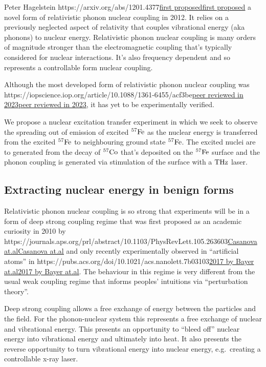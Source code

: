 \documentclass[
]{article}
\let\oldhref\href
\renewcommand{\href}[2]{\ifx#1\urlprefix\oldhref{#1}{#2}\else\uline{\oldhref{#1}{#2}}\fi}
\renewcommand{\[}{\begin{equation}}
\renewcommand{\]}{\end{equation}}
\begin{document}
Peter Hagelstein \href{https://arxiv.org/abs/1201.4377}{first proposed}
a novel form of relativistic phonon nuclear coupling in 2012. It relies
on a previously neglected aspect of relativity that couples vibrational
energy (aka phonons) to nuclear energy. Relativistic phonon nuclear
coupling is many orders of magnitude stronger than the electromagnetic
coupling that's typically considered for nuclear interactions. It's also
frequency dependent and so represents a controllable form nuclear
coupling.

Although the most developed form of relativistic phonon nuclear coupling
was
\href{https://iopscience.iop.org/article/10.1088/1361-6455/acf3be}{peer
reviewed in 2023}, it has yet to be experimentally verified.

We propose a nuclear excitation transfer experiment in which we seek to
observe the spreading out of emission of excited \(\rm ^{57}Fe\) as the
nuclear energy is transferred from the excited \(\rm ^{57}Fe\) to
neighbouring ground state \(\rm ^{57}Fe\). The excited nuclei are to
generated from the decay of \(\rm ^{57}Co\) that's deposited on the
\(\rm ^{57}Fe\) surface and the phonon coupling is generated via
stimulation of the surface with a \(\rm THz\) laser.

\subsection{Extracting nuclear energy in benign
forms}\label{extracting-nuclear-energy-in-benign-forms}

Relativistic phonon nuclear coupling is so strong that experiments will
be in a form of deep strong coupling regime that was first proposed as
an academic curiosity in 2010 by
\href{https://journals.aps.org/prl/abstract/10.1103/PhysRevLett.105.263603}{Casanova
at.al} and only recently experimentally observed in ``artificial atoms''
in \href{https://pubs.acs.org/doi/10.1021/acs.nanolett.7b03103}{2017 by
Bayer at.al}. The behaviour in this regime is very different from the
usual weak coupling regime that informs peoples' intuitions via
``perturbation theory''.

Deep strong coupling allows a free exchange of energy between the
particles and the field. For the phonon-nuclear system this represents a
free exchange of nuclear and vibrational energy. This presents an
opportunity to ``bleed off'' nuclear energy into vibrational energy and
ultimately into heat. It also presents the reverse opportunity to turn
vibrational energy into nuclear energy, e.g.~creating a controllable
x-ray laser.
\end{document}
